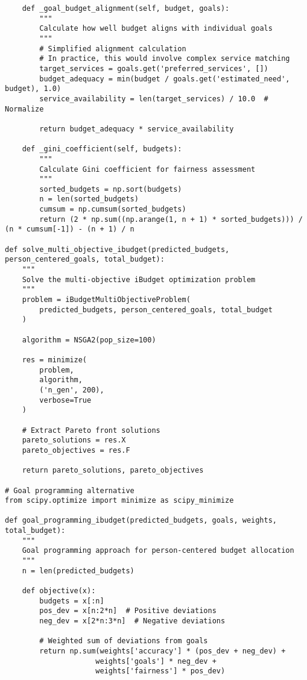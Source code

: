 \begin{lstlisting}
    def _goal_budget_alignment(self, budget, goals):
        """
        Calculate how well budget aligns with individual goals
        """
        # Simplified alignment calculation
        # In practice, this would involve complex service matching
        target_services = goals.get('preferred_services', [])
        budget_adequacy = min(budget / goals.get('estimated_need', budget), 1.0)
        service_availability = len(target_services) / 10.0  # Normalize
        
        return budget_adequacy * service_availability
    
    def _gini_coefficient(self, budgets):
        """
        Calculate Gini coefficient for fairness assessment
        """
        sorted_budgets = np.sort(budgets)
        n = len(sorted_budgets)
        cumsum = np.cumsum(sorted_budgets)
        return (2 * np.sum((np.arange(1, n + 1) * sorted_budgets))) / (n * cumsum[-1]) - (n + 1) / n

def solve_multi_objective_ibudget(predicted_budgets, person_centered_goals, total_budget):
    """
    Solve the multi-objective iBudget optimization problem
    """
    problem = iBudgetMultiObjectiveProblem(
        predicted_budgets, person_centered_goals, total_budget
    )
    
    algorithm = NSGA2(pop_size=100)
    
    res = minimize(
        problem,
        algorithm,
        ('n_gen', 200),
        verbose=True
    )
    
    # Extract Pareto front solutions
    pareto_solutions = res.X
    pareto_objectives = res.F
    
    return pareto_solutions, pareto_objectives

# Goal programming alternative
from scipy.optimize import minimize as scipy_minimize

def goal_programming_ibudget(predicted_budgets, goals, weights, total_budget):
    """
    Goal programming approach for person-centered budget allocation
    """
    n = len(predicted_budgets)
    
    def objective(x):
        budgets = x[:n]
        pos_dev = x[n:2*n]  # Positive deviations
        neg_dev = x[2*n:3*n]  # Negative deviations
        
        # Weighted sum of deviations from goals
        return np.sum(weights['accuracy'] * (pos_dev + neg_dev) + 
                     weights['goals'] * neg_dev +
                     weights['fairness'] * pos_dev)
    

\end{lstlisting}

